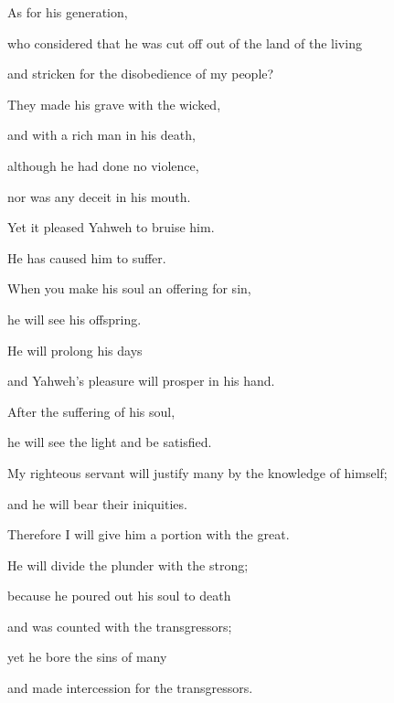 {\par }{\QB As for his generation,
\par }{\QB who considered that he was cut off out of the land of the living
\par }{\QB and stricken for the disobedience of my people?
\par }{\Q {}They made his grave with the wicked,
\par }{\QB and with a rich man in his death,
\par }{\Q although he had done no violence,
\par }{\QB nor was any deceit in his mouth.
\par }{\BB \par }{\Q {}Yet it pleased Yahweh to bruise him.
\par }{\QB He has caused him to suffer.
\par }{\Q When you make his soul an offering for sin,
\par }{\QB he will see his offspring.
\par }{\Q He will prolong his days
\par }{\QB and Yahweh’s pleasure will prosper in his hand.
\par }{\Q {}After the suffering of his soul,
\par }{\QB he will see the light and be satisfied.
\par }{\Q My righteous servant will justify many by the knowledge of himself;
\par }{\QB and he will bear their iniquities.
\par }{\Q {}Therefore I will give him a portion with the great.
\par }{\QB He will divide the plunder with the strong;
\par }{\Q because he poured out his soul to death
\par }{\QB and was counted with the transgressors;
\par }{\Q yet he bore the sins of many
\par }{\QB and made intercession for the transgressors.

}
